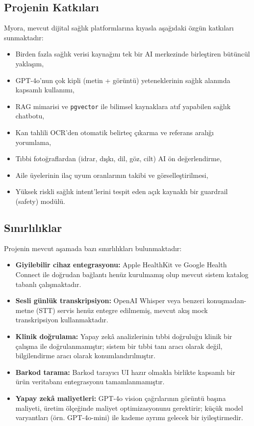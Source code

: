 \subsection{Projenin Katkıları}

Myora, mevcut dijital sağlık platformlarına kıyasla aşağıdaki özgün katkıları sunmaktadır:

\begin{itemize}
    \item Birden fazla sağlık verisi kaynağını tek bir AI merkezinde birleştiren bütüncül yaklaşım,
    \item GPT-4o'nun çok kipli (metin + görüntü) yeteneklerinin sağlık alanında kapsamlı kullanımı,
    \item RAG mimarisi ve \texttt{pgvector} ile bilimsel kaynaklara atıf yapabilen sağlık chatbotu,
    \item Kan tahlili OCR'den otomatik belirteç çıkarma ve referans aralığı yorumlama,
    \item Tıbbi fotoğraflardan (idrar, dışkı, dil, göz, cilt) AI ön değerlendirme,
    \item Aile üyelerinin ilaç uyum oranlarının takibi ve görselleştirilmesi,
    \item Yüksek riskli sağlık intent'lerini tespit eden açık kaynaklı bir guardrail (safety) modülü.
\end{itemize}

\subsection{Sınırlılıklar}

Projenin mevcut aşamada bazı sınırlılıkları bulunmaktadır:

\begin{itemize}
    \item \textbf{Giyilebilir cihaz entegrasyonu:} Apple HealthKit ve Google Health Connect ile doğrudan bağlantı henüz kurulmamış olup mevcut sistem katalog tabanlı çalışmaktadır.
    \item \textbf{Sesli günlük transkripsiyon:} OpenAI Whisper veya benzeri konuşmadan-metne (STT) servis henüz entegre edilmemiş, mevcut akış mock transkripsiyon kullanmaktadır.
    \item \textbf{Klinik doğrulama:} Yapay zekâ analizlerinin tıbbi doğruluğu klinik bir çalışma ile doğrulanmamıştır; sistem bir tıbbi tanı aracı olarak değil, bilgilendirme aracı olarak konumlandırılmıştır.
    \item \textbf{Barkod tarama:} Barkod tarayıcı UI hazır olmakla birlikte kapsamlı bir ürün veritabanı entegrasyonu tamamlanmamıştır.
    \item \textbf{Yapay zekâ maliyetleri:} GPT-4o vision çağrılarının görüntü başına maliyeti, üretim ölçeğinde maliyet optimizasyonunu gerektirir; küçük model varyantları (örn. GPT-4o-mini) ile kademe ayrımı gelecek bir iyileştirmedir.
\end{itemize}

